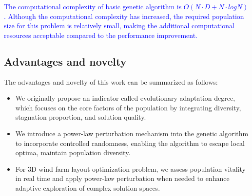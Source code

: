 \documentclass[journal,twoside]{IEEEtran}
\begin{document}
\textcolor{blue}{The computational complexity of basic genetic algorithm is $O(N \cdot D + N \cdot logN)$. Although the computational complexity has increased, the required population size for this problem is relatively small, making the additional computational resources acceptable compared to the performance improvement.}	
\subsection{Advantages and novelty}
The advantages and novelty of this work can be summarized as follows:
\begin{itemize}
	\item [1)]We originally propose an indicator called evolutionary adaptation degree, which focuses on the core factors of the population by integrating diversity, stagnation proportion, and solution quality. 
	\item [2)]We introduce a power-law perturbation mechanism into the genetic algorithm to incorporate controlled randomness, enabling the algorithm to escape local optima, maintain population diversity.
	\item [3)]For 3D wind farm layout optimization problem, we assess population vitality in real time and apply power-law perturbation when needed to enhance adaptive exploration of complex solution spaces.
\end{itemize}

\begin{algorithm}[!t]
	\caption{The pseudo-code of PPGA}
	\DontPrintSemicolon
	\label{alg1} 
\end{algorithm}
\end{document}
